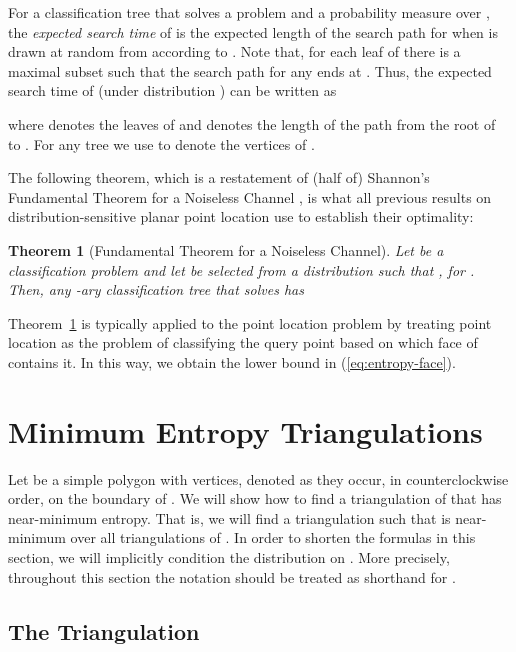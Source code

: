 \documentclass[lotsofwhite]{patmorin}
\newcommand{\seclabel}[1]{\label{sec:#1}}
\newcommand{\eqrefx}[1]{(\ref{eq:#1})}
\newtheorem{thm}{Theorem}{\bfseries}{\itshape}
\newcommand{\thmlabel}[1]{\label{thm:#1}}
\newcommand{\thmref}[1]{Theorem~\ref{thm:#1}}
\begin{document}
For a classification tree  that solves a problem
 and a probability measure 
over , the \emph{expected search time} of  is the
expected length of the search path for  when  is drawn at random
from  according to .  Note that, for each leaf 
of  there is a maximal subset  such
that the search path for any  ends at .  Thus, the
expected search time of  (under distribution ) can be written as

where  denotes the leaves of  and  denotes the
length of the path from the root of  to .  For any tree 
we use  to denote the vertices of .


The following theorem, which is a restatement of (half of) Shannon's
Fundamental Theorem for a Noiseless Channel \cite[Theorem 9]{s48}, is
what all previous results on distribution-sensitive planar point
location use to establish their optimality:

\begin{thm}[Fundamental Theorem for a Noiseless Channel]\thmlabel{shannon}
Let  be a classification
problem and let  be selected from a distribution  such
that , for .  Then, any
-ary classification tree  that solves  has

\end{thm}
\thmref{shannon} is typically applied to the point location problem by
treating point location as the problem of classifying the query point
 based on which face of  contains it.  In this way, we obtain
the lower bound in \eqrefx{entropy-face}.



\section{Minimum Entropy Triangulations} 
\seclabel{polygons}

Let  be a simple polygon with  vertices, denoted
 as they occur, in counterclockwise order, on the
boundary of .  We will show how to find a triangulation of  that
has near-minimum entropy.  That is, we will find a triangulation
 such that  is near-minimum over all
triangulations of .  In order to shorten the formulas in this
section, we will implicitly condition the distribution  on .
More precisely, throughout this section the notation  should
be treated as shorthand for .

\subsection{The Triangulation }
\seclabel{delta}
\end{document}
